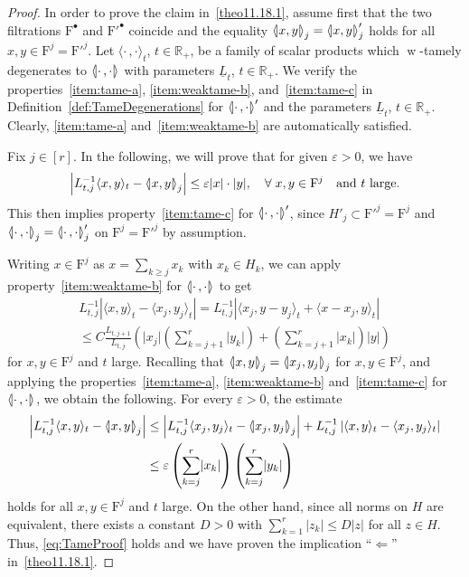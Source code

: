 \documentclass[AHL,Unicode,longabstracts]{cedram}
\newcommand{\innone}[2]{{\langle#2\rangle_{#1}}}
\newcommand{\llangle}{\mathopen{\langle\mkern -3.1mu\lvert}}
\newcommand{\rrangle}{\mathclose{\rvert\mkern -3.1mu\rangle}}
\newcommand{\highinn}[2]{{\llangle#2\rrangle_{#1}}}
\newcommand{\highinnprime}[2]{{\llangle #2\rrangle'_{#1}}}
\newcommand{\refnorm}[1]{\lvert#1\rvert}
\newcommand{\abss}[1]{\left\lvert #1\right\rvert}
\DeclareMathOperator{\weak}{w}
\newcommand{\filter}{\mathrm{F}}
\newcommand{\R}{\mathbb{R}}
\let\oldforall\forall
\renewcommand*{\forall}{\mathrel{\oldforall}}
\begin{document}
\begin{proof}
In order to prove the claim in~\eqref{theo11.18.1}, assume first that the two filtrations $\filter^\bullet$ and ${\filter'}^\bullet$ coincide and the equality $\highinn{j}{x,y} = \highinnprime{j}{x,y }$ holds for all $x,y \in \filter^j = {\filter'}^j$. Let $\innone{t}{\cdot\,, \cdot}$, $t \in \R_+$, be a family of scalar products which $\weak$-tamely degenerates to $\highinn{}{\cdot \,, \cdot}$ with parameters $\underline L_t$, $t \in \R_+$. We verify the properties~\eqref{item:tame-a}, \eqref{item:weaktame-b}, and~\eqref{item:tame-c} in Definition~\ref{def:TameDegenerations} for $\highinnprime{}{\cdot\,,\cdot}$ and the parameters $\underline L_t$, $t \in \R_+$. Clearly, \eqref{item:tame-a} and~\eqref{item:weaktame-b} are automatically satisfied.

Fix $j \in [r]$. In the following, we will prove that for given $\varepsilon >0$, we have
\begin{equation}\label{eq:TameProof}
\abss{L_{t,j}^{-1} \innone{t}{x, y} - \highinn{j}{x, y}} \leq \varepsilon \refnorm{x}\cdot\refnorm{y}, \quad \forall x,y \in \filter^j \quad\text{and $t$ large}.
\end{equation}
This then implies property~\eqref{item:tame-c} for $\highinnprime{}{\cdot\,,\cdot}$, since $H'_j \subset {\filter'}^j = \filter^j$ and $\highinn{j}{\cdot \,,\cdot} = \highinnprime{j}{\cdot \,, \cdot}$ on $\filter^j = {\filter'}^j$ by assumption.

Writing $x \in \filter^j$ as $x = \sum_{k \ge j} x_k$ with $x_k \in H_k$, we can apply property~\eqref{item:weaktame-b} for $\highinn{}{\cdot\,,\cdot}$ to get
\begin{multline*}
L_{t,j}^{-1} \abss{\innone{t}{x,y} - \innone{t}{x_j,y_j} } = L_{t,j}^{-1} \abss{ \innone{t}{x_j,y-y_j} + \innone{t}{x-x_j,y}} \\
 \le C \frac{L_{t,j+1}}{L_{t,j}} \left(\refnorm{x_j} \left(\sum_{k=j+1}^r \refnorm{y_k}\right) + \left(\sum_{k=j+1}^r \refnorm{x_k}\right) \refnorm{y} \right)
\end{multline*}
for $x,y \in \filter^j$ and $t$ large. Recalling that $\highinn{j}{x,y} = \highinn{j}{x_j, y_j}$ for $x,y \in \filter^j$, and applying the properties~\eqref{item:tame-a}, \eqref{item:weaktame-b} and~\eqref{item:tame-c} for $\highinn{}{\cdot \,, \cdot}$, we obtain the following. For every $\varepsilon >0$, the estimate
\begin{align*}
\abss{ L_{t,j}^{-1}\innone{t}{x,y} - \highinn{j}{x,y}} &\le \abss{ L_{t,j}^{-1}\innone{t}{x_j,y_j} - \highinn{j}{x_j,y_j}} + L_{t,j}^{-1} \abss{ \innone{t}{x,y} - \innone{t}{x_j,y_j}}\\
&\le \varepsilon \left(\sum_{k =j}^r \refnorm{x_k}\right) \left(\sum_{k =j}^r \refnorm{y_k}\right)
\end{align*}
holds for all $x, y \in \filter^j$ and $t$ large. On the other hand, since all norms on $H$ are equivalent, there exists a constant $D >0$ with $\sum_{k=1}^r \refnorm{z_k} \le D \refnorm{z}$ for all $z \in H$. Thus, \eqref{eq:TameProof} holds and we have proven the implication ``$\Leftarrow$'' in~\eqref{theo11.18.1}.


\end{proof}
\end{document}
